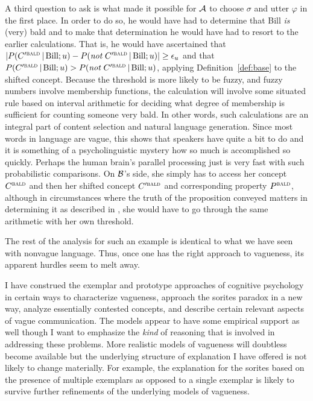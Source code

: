 A third question to ask is what made it possible for $\cal A$ to choose $\sigma$ and utter $\varphi$ in the first place. In order to do so, he would have had to determine that Bill \emph{is} (very) bald and to make that determination he would have had to resort to the earlier calculations. That is, he would have ascertained that $|P(C'^{\Expression{bald}} \cond \hbox{Bill}; u) - P(\emph{not}\ C'^{\Expression{bald}} \cond \hbox{Bill}; u)| \geq \epsilon_u$ and that $P(C'^{\Expression{bald}} \cond \hbox{Bill}; u) > P(\emph{not}\ C'^{\Expression{bald}} \cond \hbox{Bill}; u)$, applying Definition~\ref{def:base} to the shifted concept. Because the threshold is more likely to be fuzzy, and fuzzy numbers involve membership functions, the calculation will involve some situated rule based on interval arithmetic for deciding what degree of membership is sufficient for counting someone very bald. In other words, such calculations are an integral part of content selection and natural language generation. Since most words in language are vague, this shows that speakers have quite a bit to do and it is something of a psycholinguistic mystery how so much is accomplished so quickly. Perhaps the human brain's parallel processing just is very fast with such probabilistic comparisons. On $\cal B$'s side, she simply has to access her concept $C^{\Expression{bald}}$ and then her shifted concept $C'^{\Expression{bald}}$ and corresponding property $P^\Expression{bald}$, although in circumstances where the truth of the proposition conveyed matters in determining it as described in , she would have to go through the same arithmetic with her own threshold.

The rest of the analysis for such an example is identical to what we have seen with nonvague language. Thus, once one has the right approach to vagueness, its apparent hurdles seem to melt away.

I have construed the exemplar and prototype approaches of cognitive psychology in certain ways to characterize vagueness, approach the sorites paradox in a new way, analyze essentially contested concepts, and describe certain relevant aspects of vague communication. The models appear to have some empirical support as well though I want to emphasize the \emph{kind} of reasoning that is involved in addressing these problems. More realistic models of vagueness will doubtless become available but the underlying structure of explanation I have offered is not likely to change materially. For example, the explanation for the sorites based on the presence of multiple exemplars as opposed to a single exemplar is likely to survive further refinements of the underlying models of vagueness.


